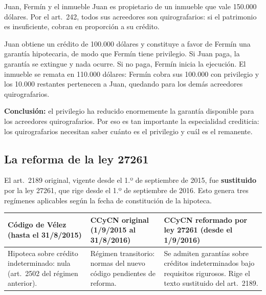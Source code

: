 \documentclass[12pt,oneside]{book}
\begin{document}
\begin{example}{Juan, Fermín y el inmueble}
Juan es propietario de un inmueble que vale 150.000 dólares. Por el art.~242, todos sus acreedores son quirografarios: si el patrimonio es insuficiente, cobran en proporción a su crédito.

Juan obtiene un crédito de 100.000 dólares y constituye a favor de Fermín una garantía hipotecaria, de modo que Fermín tiene privilegio. Si Juan paga, la garantía se extingue y nada ocurre. Si no paga, Fermín inicia la ejecución. El inmueble se remata en 110.000 dólares: Fermín cobra sus 100.000 con privilegio y los 10.000 restantes pertenecen a Juan, quedando para los demás acreedores quirografarios.

\textbf{Conclusión:} el privilegio ha reducido enormemente la garantía disponible para los acreedores quirografarios. Por eso es tan importante la especialidad crediticia: los quirografarios necesitan saber cuánto es el privilegio y cuál es el remanente.
\end{example}

\subsection{La reforma de la ley 27261}

El art.~2189 original, vigente desde el 1.º de septiembre de 2015, fue \textbf{sustituido} por la ley 27261, que rige desde el 1.º de septiembre de 2016. Esto genera tres regímenes aplicables según la fecha de constitución de la hipoteca.

\begin{table}[H]
\centering
\begin{tabularx}{\textwidth}{@{}LLL@{}}
\toprule
\textbf{Código de Vélez (hasta el 31/8/2015)} & \textbf{CCyCN original (1/9/2015 al 31/8/2016)} & \textbf{CCyCN reformado por ley 27261 (desde el 1/9/2016)} \\
\midrule
Hipoteca sobre crédito indeterminado: nula (art.~2502 del régimen anterior). & Régimen transitorio: normas del nuevo código pendientes de reforma. & Se admiten garantías sobre créditos indeterminados bajo requisitos rigurosos. Rige el texto sustituido del art.~2189. \\
\bottomrule
\end{tabularx}
\end{table}
\end{document}
